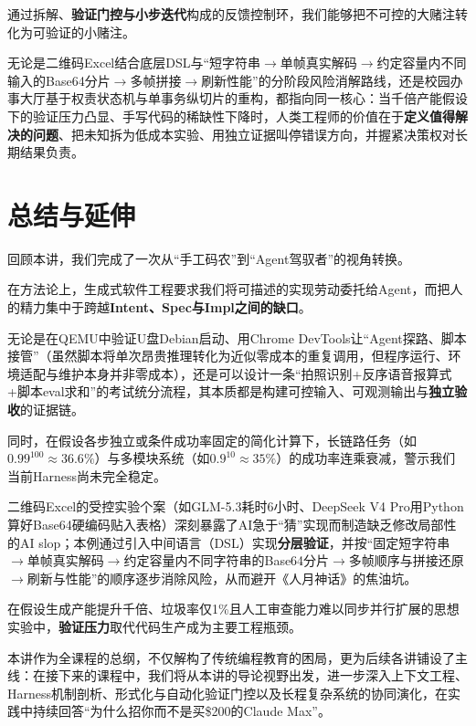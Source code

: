 \documentclass[UTF8,a4paper,11pt,fontset=fandol]{ctexart}
\begin{document}
通过拆解、\textbf{验证门控与小步迭代}构成的反馈控制环，我们能够把不可控的大赌注转化为可验证的小赌注。

无论是二维码Excel结合底层DSL与“短字符串\ensuremath{\rightarrow}单帧真实解码\ensuremath{\rightarrow}约定容量内不同输入的Base64分片\ensuremath{\rightarrow}多帧拼接\ensuremath{\rightarrow}刷新性能”的分阶段风险消解路线，还是校园办事大厅基于权责状态机与单事务纵切片的重构，都指向同一核心：当千倍产能假设下的验证压力凸显、手写代码的稀缺性下降时，人类工程师的价值在于\textbf{定义值得解决的问题}、把未知拆为低成本实验、用独立证据叫停错误方向，并握紧决策权对长期结果负责。

\section{总结与延伸}

回顾本讲，我们完成了一次从“手工码农”到“Agent驾驭者”的视角转换。

在方法论上，生成式软件工程要求我们将可描述的实现劳动委托给Agent，而把人的精力集中于跨越\textbf{Intent、Spec与Impl之间的缺口}。

无论是在QEMU中验证U盘Debian启动、用Chrome DevTools让“Agent探路、脚本接管”（虽然脚本将单次昂贵推理转化为近似零成本的重复调用，但程序运行、环境适配与维护本身并非零成本），还是可以设计一条“拍照识别+反序语音报算式+脚本eval求和”的考试统分流程，其本质都是构建可控输入、可观测输出与\textbf{独立验收}的证据链。

同时，在假设各步独立或条件成功率固定的简化计算下，长链路任务（如\(0.99^{100}\approx36.6\%\)）与多模块系统（如\(0.9^{10}\approx35\%\)）的成功率连乘衰减，警示我们当前Harness尚未完全稳定。

二维码Excel的受控实验个案（如GLM-5.3耗时6小时、DeepSeek V4 Pro用Python算好Base64硬编码贴入表格）深刻暴露了AI急于“猜”实现而制造缺乏修改局部性的AI slop；本例通过引入中间语言（DSL）实现\textbf{分层验证}，并按“固定短字符串\ensuremath{\rightarrow}单帧真实解码\ensuremath{\rightarrow}约定容量内不同字符串的Base64分片\ensuremath{\rightarrow}多帧顺序与拼接还原\ensuremath{\rightarrow}刷新与性能”的顺序逐步消除风险，从而避开《人月神话》的焦油坑。

在假设生成产能提升千倍、垃圾率仅1\%且人工审查能力难以同步并行扩展的思想实验中，\textbf{验证压力}取代代码生产成为主要工程瓶颈。

本讲作为全课程的总纲，不仅解构了传统编程教育的困局，更为后续各讲铺设了主线：在接下来的课程中，我们将从本讲的导论视野出发，进一步深入上下文工程、Harness机制剖析、形式化与自动化验证门控以及长程复杂系统的协同演化，在实践中持续回答“为什么招你而不是买\$200的Claude Max”。
\end{document}
